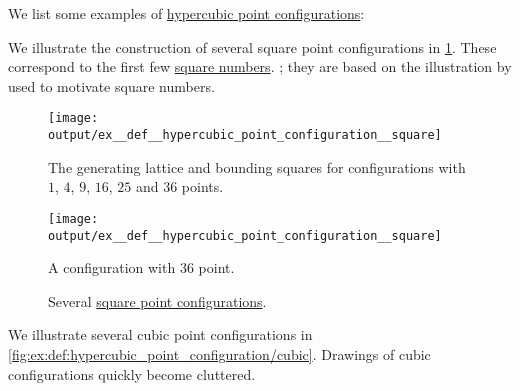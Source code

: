 \begin{example}\label{ex:def:hypercubic_point_configuration}
  We list some examples of \hyperref[def:hypercubic_point_configuration]{hypercubic point configurations}:

  \begin{thmenum}
     We illustrate the construction of several square point configurations in \cref{fig:def:hypercubic_point_configuration/square}. These correspond to the first few \hyperref[def:hypercubic_number]{square numbers}.
    ; they are based on the illustration by  used to motivate square numbers.

    \begin{figure}[!ht]
      \begin{subcaptionblock}[t]{0.45\textwidth}
        \centering
        \texttt{[image: output/ex\_\_def\_\_hypercubic\_point\_configuration\_\_square]}
        \caption{The generating lattice and bounding squares for configurations with \( 1 \), \( 4 \), \( 9 \), \( 16 \), \( 25 \) and \( 36 \) points.}\label{fig:def:hypercubic_point_configuration/square/squares}
      \end{subcaptionblock}
      \hfill
      \begin{subcaptionblock}[t]{0.45\textwidth}
        \centering
        \texttt{[image: output/ex\_\_def\_\_hypercubic\_point\_configuration\_\_square]}
        \caption{A configuration with \( 36 \) point.}\label{fig:def:hypercubic_point_configuration/square/25}
      \end{subcaptionblock}
      \caption{Several \hyperref[def:hypercubic_point_configuration]{square point configurations}.}\label{fig:def:hypercubic_point_configuration/square}
    \end{figure}

     We illustrate several cubic point configurations in \cref{fig:ex:def:hypercubic_point_configuration/cubic}. Drawings of cubic configurations quickly become cluttered.


\end{thmenum}
\end{example}
